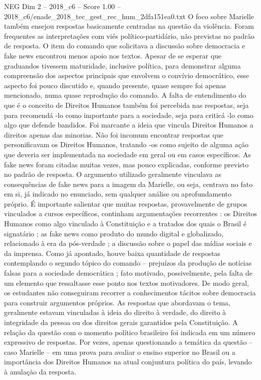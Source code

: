 \begin{textsample}{NEG Dim 2 – 2018\_c6 – Score 1.00 – 2018\_c6/enade\_2018\_tec\_gest\_rec\_hum\_2dfa151ea0.txt}
O foco sobre Marielle também ensejou respostas basicamente centradas na questão da violência.
Foram frequentes as interpretações com viés político-partidário, não previstas no padrão de resposta.
O item do comando que solicitava a discussão sobre democracia e fake news encontrou menos apoio nos textos.
Apesar de se esperar que graduandos tivessem maturidade, inclusive política, para demonstrar alguma compreensão dos aspectos principais que envolvem o convívio democrático, esse aspecto foi pouco discutido e, quando presente, quase sempre foi apenas mencionado, numa quase reprodução do comando.
A falta de entendimento do que é o conceito de Direitos Humanos também foi percebida nas respostas, seja para recomendá -lo como importante para a sociedade, seja para criticá -lo como algo que defende bandidos.
Foi marcante a ideia que vincula Direitos Humanos a direitos apenas das minorias.
Não foi incomum encontrar respostas que personificavam os Direitos Humanos, tratando -os como sujeito de alguma ação que deveria ser implementada na sociedade em geral ou em casos específicos.
As fake news foram citadas muitas vezes, mas pouco explicadas, conforme previsto no padrão de resposta.
O argumento utilizado geralmente vinculava as consequências de fake news para a imagem da Marielle, ou seja, centrava no fato em si, já indicado no enunciado, sem qualquer análise ou aprofundamento próprio.
É importante salientar que muitas respostas, provavelmente de grupos vinculados a cursos específicos, continham argumentações recorrentes : os Direitos Humanos como algo vinculado à Constituição e a tratados dos quais o Brasil é signatário ; as fake news como produto do mundo digital e globalizado, relacionado à era da pós-verdade ; a discussão sobre o papel das mídias sociais e da imprensa.
Como já apontado, houve baixa quantidade de respostas contemplando o segundo tópico do comando – prejuízos da produção de notícias falsas para a sociedade democrática ; fato motivado, possivelmente, pela falta de um elemento que ressaltasse esse ponto nos textos motivadores.
De modo geral, os estudantes não conseguiram recorrer a conhecimentos tácitos sobre democracia para construir argumentos próprios.
As respostas que abordavam o tema, geralmente estavam vinculadas à ideia do direito à verdade, do direito à integridade da pessoa ou dos direitos gerais garantidos pela Constituição.
A relação da questão com o momento político brasileiro foi indicada em um número expressivo de respostas.
Por vezes, apenas questionando a temática da questão – caso Marielle – em uma prova para avaliar o ensino superior no Brasil ou a importância dos Direitos Humanos na atual conjuntura política do país, levando à anulação da resposta.

\end{textsample}
